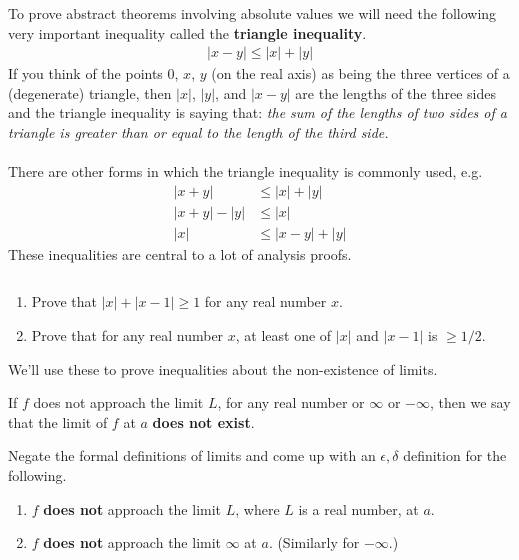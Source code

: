 To prove abstract theorems involving absolute values we will need the following very important inequality called the {\bf triangle inequality}.
\begin{align*}
	|x - y| \le |x| + |y|
\end{align*}
If you think of the points $0$, $x$, $y$ (on the real axis) as being the three vertices of a (degenerate) triangle, then $|x|$, $|y|$, and $|x - y|$ are the lengths of the three sides and the triangle inequality is saying that: {\it the sum of the lengths of two sides of a triangle is greater than or equal to the length of the third side.}\\\\
There are other forms in which the triangle inequality is commonly used, e.g.
\begin{align*}
	|x + y|       & \le |x| + |y|   \\
	|x + y| - |y| & \le |x|         \\
	|x|           & \le |x-y| + |y|
\end{align*}
These inequalities are central to a lot of analysis proofs.

\begin{exercise}$ $
	\begin{enumerate}
		\item Prove that $|x| + |x - 1| \ge 1$ for any real number $x$.
		\item Prove that for any real number $x$, at least one of $|x|$ and $|x-1|$ is $\ge 1/2$.
	\end{enumerate}
\end{exercise}

We'll use these to prove inequalities about the non-existence of limits.

\begin{definition}
	If $f$ does not approach the limit $L$, for any real number or $\infty$ or $-\infty$, then we say that the limit of $f$ at $a$ {\bf does not exist}.
\end{definition}

\begin{exercise}
	\label{q:formal_definition_non_existence_limit}
	Negate the formal definitions of limits and come up with an $\epsilon, \delta$ definition for the following.
	\begin{enumerate}
		\item $f$ {\bf does not} approach the limit $L$, where $L$ is a real number, at $a$.
		\item $f$ {\bf does not} approach the limit $\infty$ at $a$. (Similarly for $-\infty$.)
	\end{enumerate}
\end{exercise}

